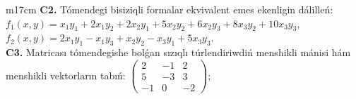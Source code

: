 \documentclass{article}
\begin{document}
\begin{tabular}{m{17cm}}
\textbf{C2.} Tómendegi bisiziqli formalar ekvivalent emes ekenligin dálilleń:\(f_{1}(x,y) = x_{1}y_{1} + 2x_{1}y_{2} + 2x_{2}y_{1} + 5x_{2}y_{2} + 6x_{2}y_{3} + 8x_{3}y_{2} + 10x_{3}y_{3}\), \(f_{2}(x,y) = 2x_{1}y_{1} - x_{1}y_{3} + x_{2}y_{2} - x_{3}y_{1} + 5x_{3}y_{3}\). \\
\textbf{C3.} Matricası tómendegishe bolǵan sızıqlı túrlendiriwdiń menshikli mánisi hám menshikli vektorların tabıń: \(\begin{pmatrix} 2 & - 1 & 2 \\ 5 & - 3 & 3 \\  - 1 & 0 & - 2 \end{pmatrix}\); \\

\end{tabular}
\vspace{1cm}
\end{document}
